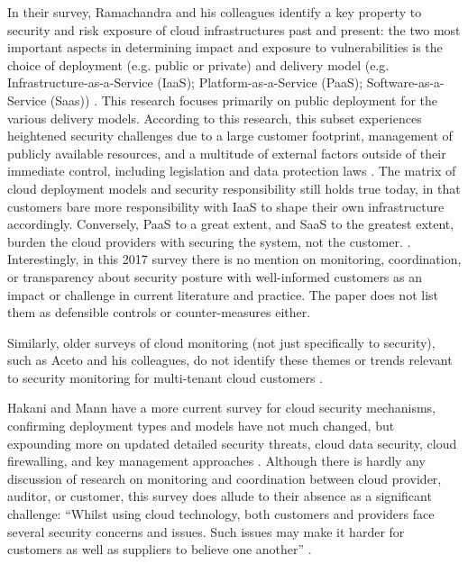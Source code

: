\documentclass{jdf}
\begin{document}
In their survey, Ramachandra and his colleagues identify a key property to security and risk exposure of cloud infrastructures past and present: the two most important aspects in determining impact and exposure to vulnerabilities is the choice of deployment (e.g. public or private) and delivery model (e.g. Infrastructure-as-a-Service (IaaS); Platform-as-a-Service (PaaS); Software-as-a-Service (Saas)) \citeyear[p.~468]{ramachandra17}. This research focuses primarily on public deployment for the various delivery models. According to this research, this subset experiences heightened security challenges due to a large customer footprint, management of publicly available resources, and a multitude of external factors outside of their immediate control, including legislation and data protection laws \cite[p.468]{ramachandra17}. The matrix of cloud deployment models and security responsibility still holds true today, in that customers bare more responsibility with IaaS to shape their own infrastructure accordingly. Conversely, PaaS to a great extent, and SaaS to the greatest extent, burden the cloud providers with securing the system, not the customer. \cite[p.~469]{ramachandra17}. Interestingly, in this 2017 survey there is no mention on monitoring, coordination, or transparency about security posture with well-informed customers as an impact or challenge in current literature and practice. The paper does not list them as defensible controls or counter-measures either.

Similarly, older surveys of cloud monitoring (not just specifically to security), such as Aceto and his colleagues, do not identify these themes or trends relevant to security monitoring for multi-tenant cloud customers \citeyear{aceto13}.

Hakani and Mann have a more current survey for cloud security mechanisms, confirming deployment types and models have not much changed, but expounding more on updated detailed security threats, cloud data security, cloud firewalling, and key management approaches \citeyear{hakani22}. Although there is hardly any discussion of research on monitoring and coordination between cloud provider, auditor, or customer, this survey does allude to their absence as a significant challenge: ``Whilst using cloud technology, both customers and providers face several security concerns and issues. Such issues may make it harder for customers as well as suppliers to believe one another'' \citeyear[p.~475]{hakani22}.
\end{document}

